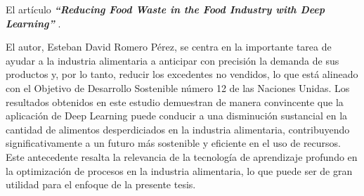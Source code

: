 \vspace{1\baselineskip}
El artículo \textbf{\textit{ “Reducing Food Waste in the Food Industry with Deep Learning” }}\cite{afanador2022diseno}.

El autor, Esteban David Romero Pérez, se centra en la importante tarea de
ayudar a la industria alimentaria a anticipar con precisión la demanda de sus
productos y, por lo tanto, reducir los excedentes no vendidos, lo que está
alineado con el Objetivo de Desarrollo Sostenible número 12 de las Naciones
Unidas. Los resultados obtenidos en este estudio demuestran de manera
convincente que la aplicación de Deep Learning puede conducir a una disminución
sustancial en la cantidad de alimentos desperdiciados en la industria
alimentaria, contribuyendo significativamente a un futuro más sostenible y
eficiente en el uso de recursos. Este antecedente resalta la relevancia de la
tecnología de aprendizaje profundo en la optimización de procesos en la
industria alimentaria, lo que puede ser de gran utilidad para el enfoque de la
presente tesis.










